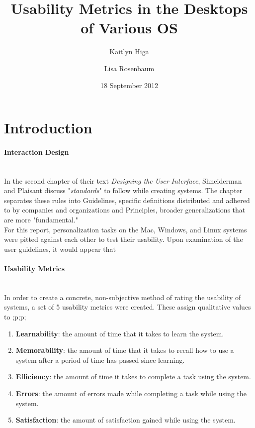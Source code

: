 \documentclass[12pt, onesided, letterpaper]{report}
\begin{document}
\title{Usability Metrics in the Desktops of Various OS}
\date{18 September 2012}
\author{Kaitlyn Higa \and Lisa Rosenbaum}
\maketitle


\section*{Introduction}
\paragraph*{Interaction Design}~\\
In the second chapter of their text \emph{Designing the User Interface}, Shneiderman and Plaisant discuss "\emph{standards}" to follow while creating systems.  The chapter separates these rules into Guidelines, specific definitions distributed and adhered to by companies and organizations and Principles, broader generalizations that are more "fundamental."  \\
For this report, personalization tasks on the Mac, Windows, and Linux systems were pitted against each other to test their usability.  Upon examination of the user guidelines, it would appear that 
\paragraph*{Usability Metrics} ~\\
In order to create a concrete, non-subjective method of rating the usability of systems, a set of 5 usability metrics were created.  These assign qualitative values to ;p;p;
\begin{enumerate}
\item \textbf{Learnability}: the amount of time that it takes to learn the system.  
\item \textbf{Memorability}: the amount of time that it takes to recall how to use a system after a period of time has passed since learning.  
\item \textbf{Efficiency}: the amount of time it takes to complete a task using the system.
\item \textbf{Errors}: the amount of errors made while completing a task while using the system.
\item \textbf{Satisfaction}: the amount of satisfaction gained while using the system. 
\end{enumerate}
\end{document}
